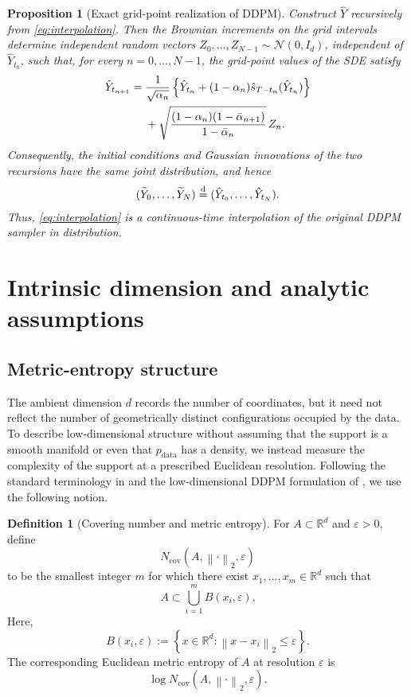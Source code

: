 \documentclass[11pt]{article}
\newtheorem{proposition}[theorem]{Proposition}
\theoremstyle{definition}
\newtheorem{definition}[theorem]{Definition}
\newcommand{\R}{\mathbb{R}}
\newcommand{\N}{\mathcal{N}}
\newcommand{\Id}{I_d}
\newcommand{\pdata}{p_{\mathrm{data}}}
\newcommand{\norm}[1]{\left\lVert #1\right\rVert_2}
\begin{document}
\begin{proposition}[Exact grid-point realization of DDPM]
\label{prop:interpolation}
Construct $\hat Y$ recursively from \eqref{eq:interpolation}. Then the
Brownian increments on the grid intervals determine independent
random vectors $Z_0,\ldots,Z_{N-1}\sim\N(0,\Id)$, independent of
$\hat Y_{t_0}$, such that, for every $n=0,\ldots,N-1$, the
grid-point values of the SDE satisfy
\begin{align}
    \hat Y_{t_{n+1}}
    ={}&\frac{1}{\sqrt{\alpha_n}}
       \left\{\hat Y_{t_n}+(1-\alpha_n)
       \hat s_{T-t_n}(\hat Y_{t_n})\right\}\notag\\
    &+\sqrt{\frac{(1-\alpha_n)(1-\bar\alpha_{n+1})}
       {1-\bar\alpha_n}}\,Z_n.\notag
\end{align}
Consequently, the initial conditions and Gaussian innovations of the
two recursions have the same joint distribution, and hence
\begin{align}
    (\widetilde Y_0,\ldots,\widetilde Y_N)
    \overset{\mathrm d}{=}
    (\hat Y_{t_0},\ldots,\hat Y_{t_N}).
    \notag
\end{align}
Thus, \eqref{eq:interpolation} is a continuous-time interpolation of
the original DDPM sampler in distribution.
\end{proposition}

\section{Intrinsic dimension and analytic assumptions}
\label{sec:assumptions}

\subsection{Metric-entropy structure}

The ambient dimension $d$ records the number of coordinates, but it
need not reflect the number of geometrically distinct configurations
occupied by the data. To describe low-dimensional structure without
assuming that the support is a smooth manifold or even that
$\pdata$ has a density, we instead measure the complexity of the
support at a prescribed Euclidean resolution. Following the standard
terminology in \citet[Chapter~5]{wainwright2019high} and the
low-dimensional DDPM formulation of
\citet[Section~4.1.1]{huang2026optimal}, we use the following notion.

\begin{definition}[Covering number and metric entropy]
For $A\subset\R^d$ and $\varepsilon>0$, define
\[
    N_{\mathrm{cov}}(A,\norm{\cdot},\varepsilon)
\]
to be the smallest integer $m$ for which there exist
$x_1,\dots,x_m\in\R^d$ such that
\[
    A\subset\bigcup_{i=1}^m B(x_i,\varepsilon).
\]
Here,
\[
    B(x_i,\varepsilon)
    :=\left\{x\in\R^d:\norm{x-x_i}\le\varepsilon\right\}.
\]
The corresponding Euclidean metric entropy of $A$ at resolution
$\varepsilon$ is
\[
    \log N_{\mathrm{cov}}(A,\norm{\cdot},\varepsilon).
\]
\end{definition}
\end{document}
